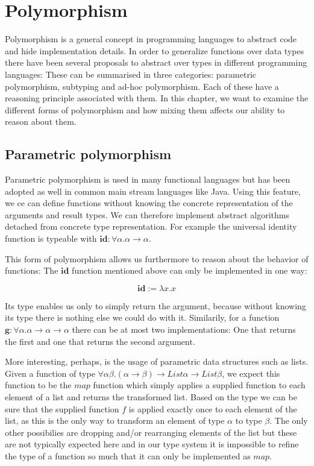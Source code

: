 \chapter{Polymorphism}\label{ch:polymorphism}

Polymorphism is a general concept in programming languages to abstract code and hide implementation details.
In order to generalize functions over data types there have been several proposals to abstract over types in different programming languages:
These can be summarised in three categories: parametric polymorphism, subtyping and ad-hoc polymorphism.
Each of these have a reasoning principle associated with them.
In this chapter, we want to examine the different forms of polymorphism and how mixing them affects our ability to reason about them.

\section{Parametric polymorphism}\label{sec:parmetric-polymorphism}

Parametric polymorphism is used in many functional languages but has been adopted as well in common main stream languages like Java.
Using this feature, we ce can define functions without knowing the concrete representation of the arguments and result types.
We can therefore implement abstract algorithms detached from concrete type representation.
For example the universal identity function is typeable with $\mathbf{id} : \forall \alpha. \alpha \to \alpha$.

This form of polymorphism allows us furthermore to reason about the behavior of functions:
The $\mathbf{id}$ function mentioned above can only be implemented in one way:

$$
\mathbf{id} := \lambda x.x
$$

Its type enables us only to simply return the argument, because without knowing its type there is nothing else we could do with it.
Similarily, for a function $\mathbf{g} : \forall \alpha. \alpha \to \alpha \to \alpha$ there can be at most two implementations:
One that returns the first and one that returns the second argument.

More interesting, perhaps, is the usage of parametric data structures such as lists.
Given a function of type $\forall \alpha \beta. (\alpha \to \beta) \to \mathit{List } \alpha \to \mathit{List } \beta$, we expect this function to be the $\mathit{map}$ function which simply applies a supplied function to each element of a list and returns the transformed list.
Based on the type we can be sure that the supplied function $f$ is applied exactly once to each element of the list, as this is the only way to transform an element of type $\alpha$ to type $\beta$.
The only other possibilies are dropping and/or rearranging elements of the list but these are not typically expected here and in our type system it is impossible to refine the type of a function so much that it can only be implemented as $\mathit{map}$.

